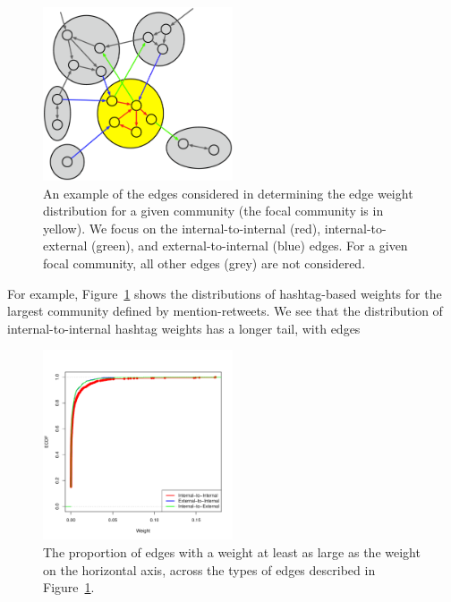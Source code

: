 \begin{figure}[h!]
  \centering
\includegraphics[width=0.50\textwidth]{figures/edge-types.eps}
\caption{An example of the edges considered in determining the edge weight distribution for a given community (the focal community is in yellow). We focus on the internal-to-internal (red), internal-to-external (green), and external-to-internal (blue) edges. For a given focal community, all other edges (grey) are not considered.}
\label{Fig-edge_types}
\end{figure}

For example, Figure~\ref{Fig-edge_types} shows the distributions of hashtag-based weights for the largest community defined by mention-retweets. We see that the distribution of internal-to-internal hashtag weights has a longer tail, with edges 

\begin{figure}[h!]
  \centering
\includegraphics[width=0.50\textwidth]{Figures/comm0_labels-mention-retweet_weights-hashtag-ecdf.pdf}
\caption{The proportion of edges with a weight at least as large as the weight on the horizontal axis, across the types of edges described in Figure~\ref{Fig-edge_types}.}
\label{Fig-dist_across_community}
\end{figure}

